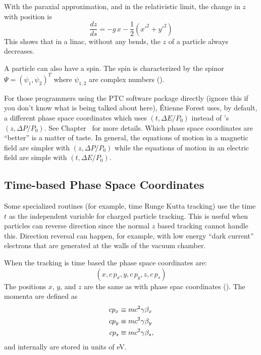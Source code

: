 With the paraxial approximation, and in the relativistic limit, the
change in $z$ with position is
\begin{equation}
  \frac{dz}{ds} = -g \, x - \frac{1}{2} (x'^2 + y'^2)
\end{equation}
This shows that in a linac, without any bends, the $z$ of a particle
always decreases.

A particle can also have a spin. The spin is characterized by the
spinor $\Psi = \left( \psi_{1}, \psi_{2} \right)^{T}$ where
$\psi_{1,2}$ are complex numbers ().

For those programmers using the PTC software package
directly (ignore this if you don't know what is being talked about
here), \'Etienne Forest uses, by default, a different phase space
coordinates which uses $(t, \Delta E/P_0)$ instead of \bmad's $(z,
\Delta P/P_0)$. See Chapter~ for more details. Which phase
space coordinates are ``better'' is a matter of taste. In general, the
equations of motion in a magnetic field are simpler with $(z, \Delta
P/P_0)$ while the equations of motion in an electric field are simple
with $(t, \Delta E/P_0)$.

\subsection{Time-based Phase Space Coordinates}
\label{s:time.phase.space}

Some specialized routines (for example, time Runge Kutta tracking) use
the time $t$ as the independent variable for charged particle
tracking. This is useful when particles can reverse direction since the normal
$z$ based tracking cannot handle this. Direction reversal can happen, for example,
with low energy ``dark current'' electrons that are generated at the
walls of the vacuum chamber.

When the tracking is time based the phase space coordinates are:
\begin{equation}
  (x, c \, p_x, y, c \, p_y, z, c \, p_s)
\end{equation}
The positions $x$, $y$, and $z$ are the same as with phase spac
coordinates (). The momenta are defined as
\begin{align}
c p_x &\equiv m c^2 \gamma \beta_x \nonumber \\
c p_y &\equiv m c^2 \gamma \beta_y \\
c p_s &\equiv m c^2 \gamma \beta_s, \nonumber
\end{align}
and internally are stored in units of eV.

